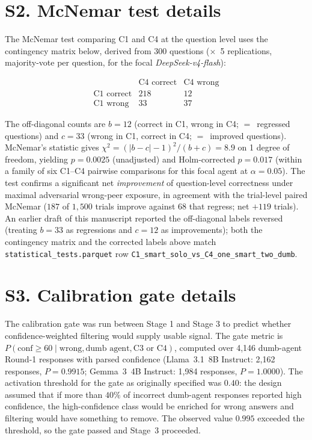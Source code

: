 \documentclass[review,3p,authoryear]{elsarticle}
\begin{document}
\section*{S2. McNemar test details}
\label{ssec:mcnemar}

The McNemar test comparing C1 and C4 at the question level uses the
contingency matrix below, derived from 300 questions ($\times$~5
replications, majority-vote per question, for the focal
\textit{DeepSeek-v4-flash}):

\[
\begin{array}{l|cc}
                & \text{C4 correct} & \text{C4 wrong} \\
\hline
\text{C1 correct} & 218 & 12 \\
\text{C1 wrong}   & 33  & 37
\end{array}
\]

The off-diagonal counts are $b = 12$ (correct in C1, wrong in C4;
$=$~regressed questions) and $c = 33$ (wrong in C1, correct in C4;
$=$~improved questions).
McNemar's statistic gives $\chi^2 = (|b - c| - 1)^2 / (b + c) = 8.9$ on
1 degree of freedom, yielding $p = 0.0025$ (unadjusted) and
Holm-corrected $p = 0.017$ (within a family of six C1--C4 pairwise
comparisons for this focal agent at $\alpha = 0.05$).
The test confirms a significant net \emph{improvement} of
question-level correctness under maximal adversarial wrong-peer
exposure, in agreement with the trial-level paired McNemar
($187$ of $1{,}500$ trials improve against $68$ that regress; net
$+119$ trials).
An earlier draft of this manuscript reported the off-diagonal
labels reversed (treating $b = 33$ as regressions and $c = 12$ as
improvements); both the contingency matrix and the corrected labels
above match \texttt{statistical\_tests.parquet} row
\texttt{C1\_smart\_solo\_vs\_C4\_one\_smart\_two\_dumb}.

\section*{S3. Calibration gate details}
\label{ssec:calibration}

The calibration gate was run between Stage 1 and Stage 3 to predict
whether confidence-weighted filtering would supply usable signal.
The gate metric is
$P(\text{conf} \geq 60 \mid \text{wrong}, \text{dumb agent}, \text{C3
or C4})$, computed over 4{,}146 dumb-agent Round-1 responses with
parsed confidence (Llama~3.1~8B Instruct: 2{,}162 responses,
$P = 0.9915$; Gemma~3~4B Instruct: 1{,}984 responses, $P = 1.0000$).
The activation threshold for the gate as originally specified was
$0.40$: the design assumed that if more than $40\%$ of incorrect
dumb-agent responses reported high confidence, the high-confidence
class would be enriched for wrong answers and filtering would have
something to remove.
The observed value $0.995$ exceeded the threshold, so the gate passed
and Stage~3 proceeded.
\end{document}
